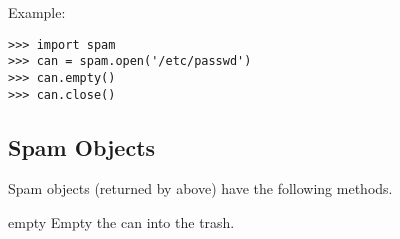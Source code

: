 Example:

\bcode\begin{verbatim}
>>> import spam
>>> can = spam.open('/etc/passwd')
>>> can.empty()
>>> can.close()
\end{verbatim}\ecode
%

\subsection{Spam Objects}

Spam objects (returned by  above) have the following
methods.

\renewcommand{\indexsubitem}{(spam method)}

\begin{funcdesc}{empty}{}
Empty the can into the trash.
\end{funcdesc}
